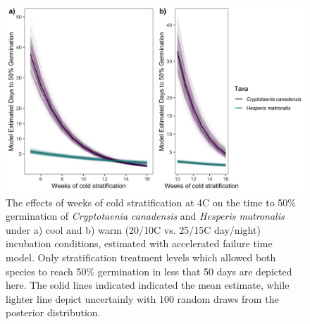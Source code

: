 \documentclass{article}\usepackage[]{graphicx}\usepackage[]{color}
\begin{document}
\begin{figure}[h!]
    \centering
          \includegraphics[width=\textwidth]{..//figure/AFTsivansive.jpeg}
\caption{The effects of weeks of cold stratification at 4\degree C on the time to 50\% germination of \textit {Cryptotaenia canadensis} and \textit{Hesperis matronalis} under a) cool and b) warm (20/10\degree C vs. 25/15\degree C day/night) incubation conditions, estimated with accelerated failure time model. Only stratification treatment levels which allowed both species to reach 50\% germination in less that 50 days are depicted here. The solid lines indicated indicated the mean estimate, while lighter line depict uncertainly with 100 random draws from the posterior distribution.}
    \label{fig:aft}
\end{figure}
\end{document}
